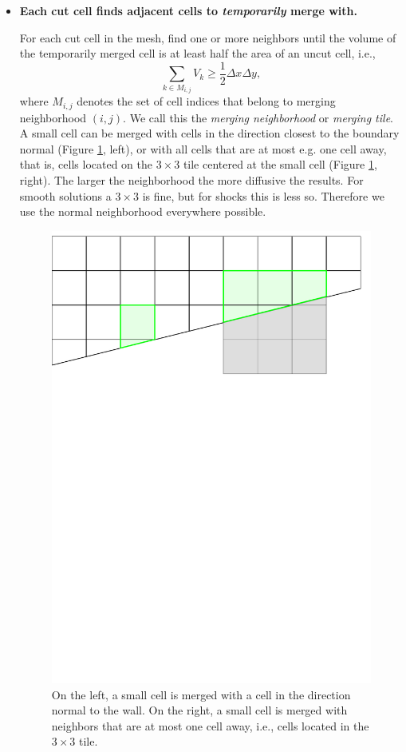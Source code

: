 \begin{itemize}
\item
{\bf Each cut cell finds adjacent cells to {\em temporarily} merge with.}

\vspace*{.1in}
For each cut cell in the mesh, find  one or more neighbors until the
volume of the temporarily merged cell is at least half the area of an uncut cell, i.e., 
\begin{equation} \label{eqn:vmerge}
\sum_{k \in M_{i,j}} V_{k} \geq \frac{1}{2}\Delta x\Delta y,
\end{equation}
where $M_{i,j}$ denotes the set of cell indices that belong to merging neighborhood $(i,j)$.
We call this the 
{\em  merging neighborhood} or {\em merging tile}.  
A small cell can be merged with cells in the direction closest to the 
boundary normal (Figure \ref{fig:neighborhoods}, left), or with all cells 
that are at most e.g. one cell away, that is, cells located on the $3 \times 3$ 
tile centered at the small cell (Figure \ref{fig:neighborhoods}, right).
The larger the neighborhood the more diffusive the results. 
For smooth solutions a $3 \times 3$ is fine, but for shocks this is less so.
Therefore we use the normal neighborhood everywhere possible.

\begin{figure}[t]
    \centering
    \includegraphics[width=0.5\linewidth]{figs/neighborhoods.pdf}
    \caption{\sf On the left, a small cell is merged with a cell in the direction 
    normal to  the wall.  On the right, a small cell is merged with neighbors that are at most one cell away, i.e., cells located in the $3\times3$ tile.}
    \label{fig:neighborhoods}
\end{figure}



\end{itemize}
